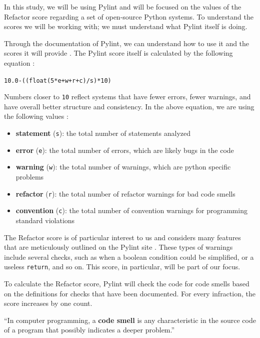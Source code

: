 \documentclass[12pt,conference]{IEEEtran}
\newcommand{\code}[1]{\texttt{#1}}
\begin{document}
In this study, we will be using Pylint and will be focused on the values of the Refactor score regarding a set of open-source Python systems. To understand the scores we will be working with; we must understand what Pylint itself is doing. 

Through the documentation of Pylint, we can understand how to use it and the scores it will provide \cite{pylint:main}. The Pylint score itself is calculated by the following equation \cite{pylint:score}:

\vspace{0.25cm}
\code{10.0-((float(5*e+w+r+c)/s)*10)}
\vspace{0.25cm}

Numbers closer to \code{10} reflect systems that have fewer errors, fewer warnings, and have overall better structure and consistency. In the above equation, we are using the following values \cite{pylint:docs}:

\vspace{0.25cm}
\begin{itemize}
    \item \textbf{statement} (\code{s}): the total number of statements analyzed
    \item \textbf{error} (\code{e}): the total number of errors, which are likely bugs in the code
    \item \textbf{warning} (\code{w}): the total number of warnings, which are python specific problems
    \item \textbf{refactor} (\code{r}): the total number of refactor warnings for bad code smells
    \item \textbf{convention} (\code{c}): the total number of convention warnings for programming standard violations
\end{itemize}
\vspace{0.25cm}

The Refactor score is of particular interest to us and considers many features that are meticulously outlined on the Pylint site \cite{pylint:refactor}. These types of warnings include several checks, such as when a boolean condition could be simplified, or a useless \code{return}, and so on. This score, in particular, will be part of our focus.

To calculate the Refactor score, Pylint will check the code for code smells based on the definitions for checks that have been documented. For every infraction, the score increases by one count. 

\vspace{0.25cm}
\begin{displayquote}
``In computer programming, a \textbf{code smell} is any characteristic in the source code of a program that possibly indicates a deeper problem.'' \cite{wiki:code-smells}
\end{displayquote}
\vspace{0.25cm}
\end{document}

